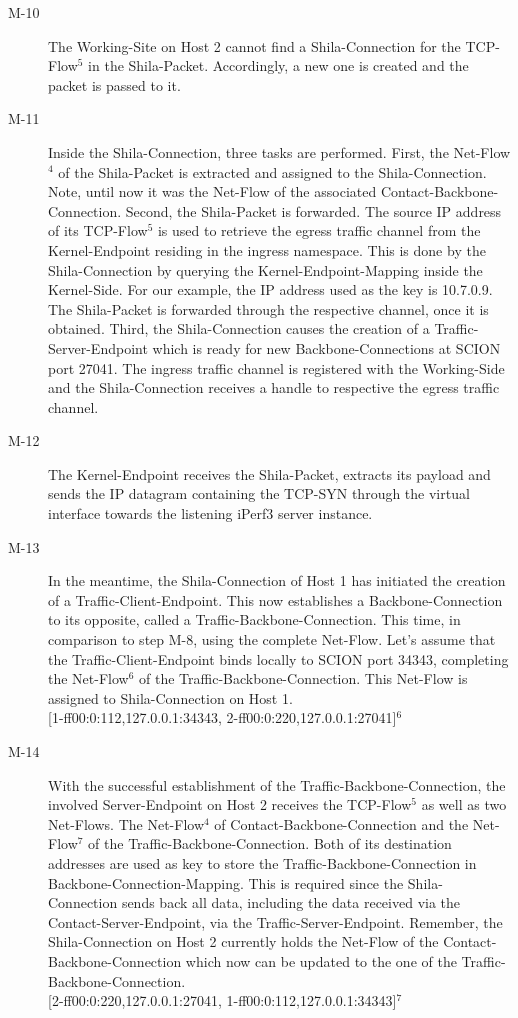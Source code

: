 \begin{description}
	\item[M-10] The Working-Site on Host 2 cannot find a Shila-Connection for the TCP-Flow$^{5}$ in the Shila-Packet. Accordingly, a new one is created and the packet is passed to it.
	\item[M-11] Inside the Shila-Connection, three tasks are performed. First, the Net-Flow$^{4}$ of the Shila-Packet is extracted and assigned to the Shila-Connection.  Note, until now it was the Net-Flow of the associated Contact-Backbone-Connection. Second, the Shila-Packet is forwarded. The source IP address of its TCP-Flow$^{5}$ is used to retrieve the egress traffic channel from the Kernel-Endpoint residing in the ingress namespace. This is done by the Shila-Connection by querying the Kernel-Endpoint-Mapping inside the Kernel-Side. For our example, the IP address used as the key is 10.7.0.9. The Shila-Packet is forwarded through the respective channel, once it is obtained. Third, the Shila-Connection causes the creation of a Traffic-Server-Endpoint which is ready for new Backbone-Connections at SCION port 27041. The ingress traffic channel is registered with the Working-Side and the Shila-Connection receives a handle to respective the egress traffic channel.
	\item[M-12] The Kernel-Endpoint receives the Shila-Packet, extracts its payload and sends the IP datagram containing the TCP-SYN through the virtual interface towards the listening iPerf3 server instance.
	\item[M-13] In the meantime, the Shila-Connection of Host 1 has initiated the creation of a Traffic-Client-Endpoint. This now establishes a Backbone-Connection to its opposite, called a Traffic-Backbone-Connection. This time, in comparison to step M-8, using the complete Net-Flow. Let's assume that the Traffic-Client-Endpoint binds locally to SCION port 34343, completing the Net-Flow$^{6}$ of the Traffic-Backbone-Connection. This Net-Flow is assigned to Shila-Connection on Host 1.
	\medskip\\{\small [1-ff00:0:112,127.0.0.1:34343, 2-ff00:0:220,127.0.0.1:27041]$^{6}$}
	\item[M-14] With the successful establishment of the Traffic-Backbone-Connection, the involved Server-Endpoint on Host 2 receives the TCP-Flow$^{5}$ as well as two Net-Flows. The Net-Flow$^{4}$ of Contact-Backbone-Connection and the Net-Flow$^{7}$ of the Traffic-Backbone-Connection. Both of its destination addresses are used as key to store the Traffic-Backbone-Connection in Backbone-Connection-Mapping. This is required since the Shila-Connection sends back all data, including the data received via the Contact-Server-Endpoint, via the Traffic-Server-Endpoint. Remember, the Shila-Connection on Host 2 currently holds the Net-Flow of the Contact-Backbone-Connection which now can be updated to the one of the Traffic-Backbone-Connection.\medskip\\{\small [2-ff00:0:220,127.0.0.1:27041, 1-ff00:0:112,127.0.0.1:34343]$^{7}$}
\end{description}	
